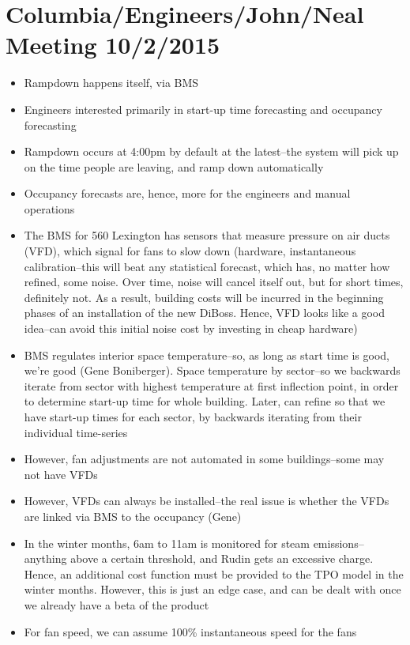 \documentclass[12pt]{article}
\begin{document}
\section*{Columbia/Engineers/John/Neal Meeting 10/2/2015}
\begin{itemize}
	\item Rampdown happens itself, via BMS
	\item Engineers interested primarily in start-up time forecasting and
		occupancy forecasting
	\item Rampdown occurs at 4:00pm by default at the latest--the system will
		pick up on the time people are leaving, and ramp down automatically
	\item Occupancy forecasts are, hence, more for the engineers and manual
		operations
	\item The BMS for 560 Lexington has sensors that measure pressure on air
		ducts (VFD), which signal for fans to slow down (hardware, instantaneous
		calibration--this will beat any statistical forecast, which has, no matter
		how refined, some noise. Over time, noise will cancel itself out, but for
		short times, definitely not. As a result, building costs will be incurred
		in the beginning phases of an installation of the new DiBoss. Hence, VFD
		looks like a good idea--can avoid this initial noise cost by investing in
		cheap hardware)
	\item BMS regulates interior space temperature--so, as long as start time
		is good, we're good (Gene Boniberger). Space temperature by sector--so we
		backwards iterate from sector with highest temperature at first inflection
		point, in order to determine start-up time for whole building. Later, can
		refine so that we have start-up times for each sector, by backwards
		iterating from their individual time-series
	\item However, fan adjustments are not automated in some buildings--some
		may not have VFDs
	\item However, VFDs can always be installed--the real issue is whether
		the VFDs are linked via BMS to the occupancy (Gene)
	\item In the winter months, 6am to 11am is monitored for steam
		emissions--anything above a certain threshold, and Rudin gets an excessive
		charge. Hence, an additional cost function must be provided to the TPO
		model in the winter months. However, this is just an edge case, and can be
		dealt with once we already have a beta of the product
	\item For fan speed, we can assume 100\% instantaneous speed for the fans

\end{itemize}
\end{document}
